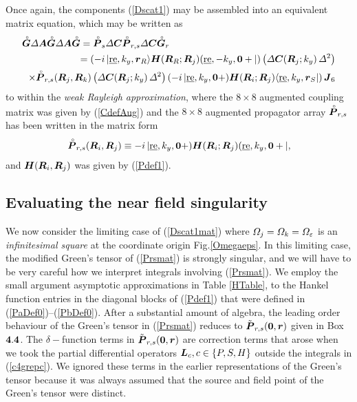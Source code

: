 Once again, the components 
(\ref{Dscat1}) may be assembled into an equivalent matrix equation, which 
may be written as
\begin{eqnarray} \label{Dscat1mat}
 \lefteqn{{\rf{\bmi G}}{\mit \Delta} {\bmi A} {\rf{\bmi G}}
{\mit \Delta} {\bmi A}{\rf{\bmi G}}= {\rf{\bmi P}_{s}}{\mit 
\Delta} {\bmi C} {\rf{\bmi P}_{r,s}}
{\mit \Delta} {\bmi C}{\rf{\bmi G}_{r}}}\nonumber\\
&&=
\left(-i\,|\re,k_y,{\bmi r}_R\rangle {\bmi  H}({\bmi  R}_{R};{\bmi  R}_{j})
	(\re,-k_y,{\bf 0}+|\right)\left({\mit \Delta}{\bmi 
	C}({\bmi R}_j;k_y)\,{\mit \Delta}^2  \right)\nonumber\\
&&\!\!
\times
{\rf{\bmi  P}_{r,s}}({\bmi  R}_{j},{\bmi  R}_{k})
\left({\mit \Delta}{\bmi  C}({\bmi R}_j;k_y)\,{\mit \Delta}^2  \right)
\left( -i\,|\re,k_y,{\bf 0}+) {\bmi  H}({\bmi  R}_{i};{\bmi  R}_{j})
	\langle\re,k_y,{\bmi r}_S|\right){\bmi J}_{6}
\end{eqnarray}
to within the {\em weak Rayleigh approximation\/},
where the $8 \times 8 $ augmented coupling matrix  was given by 
(\ref{CdefAug}) and the $8 \times 8$ augmented propagator array
 ${\stackrel{\scriptscriptstyle _{\,\,\circ}}{ \mbox{\boldmath$\mit P$\unboldmath}}_{r,s}}$ has been written 
in the  matrix form
\begin{eqnarray}	\label{Prsmat}
	{\stackrel{\scriptscriptstyle _{\,\,\circ}}{ \mbox{\boldmath$\mit P$\unboldmath}}_{r,s}}({\mbox{\boldmath$\mit R$\unboldmath}}_{i},{\mbox{\boldmath$\mit R$\unboldmath}}_{j})
		\equiv	-i\,|\underline{\mbox{re}},k_y,{\bf 0}+) {\mbox{\boldmath$\mit H$\unboldmath}}({\mbox{\boldmath$\mit R$\unboldmath}}_{i};{\mbox{\boldmath$\mit R$\unboldmath}}_{j})
	(\underline{\mbox{re}},k_y,{\bf 0}+|,
\end{eqnarray} 
and ${{\mbox{\boldmath$\mit H$\unboldmath}}}({\mbox{\boldmath$\mit R$\unboldmath}}_{i},{\mbox{\boldmath$\mit R$\unboldmath}}_{j})$ was given by 
(\ref{Pdef1}).


\subsection{Evaluating the near field singularity}




We now consider the limiting case of (\ref{Dscat1mat}) where ${\mit 
\Omega}_j={\mit \Omega}_k={\mit \Omega}_{\varepsilon}$ is an 
{\em infinitesimal square\/} at the coordinate origin Fig.\ref{Omegaeps}. 
In this limiting case, the modified 
Green's tensor of (\ref{Prsmat}) is strongly singular, and we will 
have to be very careful how we interpret integrals involving 
(\ref{Prsmat}). We employ the small argument asymptotic approximations 
in Table \ref{HTable}, 
to the Hankel function entries in the diagonal blocks of 
(\ref{Pdef1}) that were defined in (\ref{PaDef0})--(\ref{PbDef0}).
 After a substantial amount of algebra, the leading order 
behaviour of the  Green's tensor 
in (\ref{Prsmat}) reduces to ${\tilde{\mbox{\boldmath$\mit P$\unboldmath}}_{r,s}}({\bf 
0},{\mbox{\boldmath$\mit r$\unboldmath}})$ given in {\sc Box} $\bf 4.4$. The $\delta-$function terms in 
${\tilde{\mbox{\boldmath$\mit P$\unboldmath}}_{r,s}}({\bf 
0},{\mbox{\boldmath$\mit r$\unboldmath}})$ are correction terms that arose when we took the partial 
differential operators ${\mbox{\boldmath$\mit L$\unboldmath}}_c, c\in \{P,S,H\}$ outside the integrals in (\ref{c4grepc}). We 
ignored these terms in the earlier representations of the Green's 
tensor because it was always assumed that the source and field point of 
the Green's tensor were distinct.  

